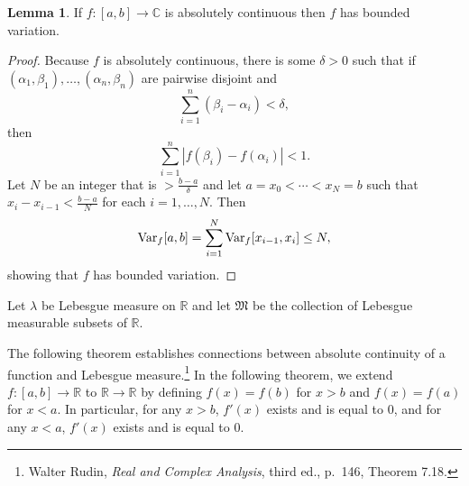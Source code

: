 \documentclass{article}
\newcommand{\Var}{\ensuremath\mathrm{Var}}
\theoremstyle{definition}
\newtheorem{lemma}[theorem]{Lemma}
\theoremstyle{definition}
\begin{document}
\begin{lemma}
If $f:[a,b] \to \mathbb{C}$ is absolutely continuous then $f$ has bounded variation.
\label{BV}
\end{lemma}
\begin{proof}
Because $f$ is absolutely continuous, there is some $\delta>0$ such that if $(\alpha_1,\beta_1),\ldots,(\alpha_n,\beta_n)$
are pairwise disjoint and
\[
\sum_{i=1}^n (\beta_i-\alpha_i) < \delta,
\]
then
\[
\sum_{i=1}^n |f(\beta_i)-f(\alpha_i)|<1.
\]
Let $N$ be an integer that is $>\frac{b-a}{\delta}$ and let
$a=x_0<\cdots<x_N=b$ such that
$x_i-x_{i-1}<\frac{b-a}{N}$ for each $i=1,\ldots,N$. Then
\[
\Var_f[a,b] = \sum_{i=1}^N \Var_f[x_{i-1},x_i]
\leq N,
\]
showing that $f$ has bounded variation.
\end{proof}

Let $\lambda$ be Lebesgue measure on $\mathbb{R}$ and let $\mathfrak{M}$ be the collection of Lebesgue measurable
subsets of $\mathbb{R}$. 

The following theorem establishes connections between absolute continuity of a function and Lebesgue measure.\footnote{Walter
Rudin, {\em Real and Complex Analysis}, third ed., p.~146, Theorem 7.18.} In the following theorem, we extend $f:[a,b] \to \mathbb{R}$
to $\mathbb{R} \to \mathbb{R}$ by defining $f(x)=f(b)$ for $x>b$ and $f(x)=f(a)$ for $x<a$. In particular, for any $x>b$,
$f'(x)$ exists and is equal to $0$, and for any $x<a$, $f'(x)$ exists and is equal to $0$.
\end{document}

